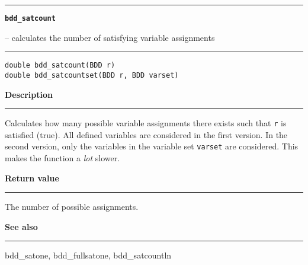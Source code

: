 \vspace{8ex}
\begin{minipage}{\textwidth}

\noindent\begin{minipage}{\textwidth}
\rule{\textwidth}{0.5mm}
{\tt\bf bdd\_satcount }
\--- calculates the number of satisfying variable assignments  \hspace{\fill}
\\\rule[1.5ex]{\textwidth}{0.5mm}
\end{minipage}

\noindent\begin{verbatim}
double bdd_satcount(BDD r)
double bdd_satcountset(BDD r, BDD varset) 
\end{verbatim}

\vspace{\parsep}\noindent
{\bf Description}\\\rule[1.5ex]{\textwidth}{0.2mm}\vspace{-1.5ex}\setlength{\parindent}{1em}
Calculates how many possible variable assignments there exists
           such that {\tt r} is satisfied (true). All defined
	   variables are considered in the first version. In the
	   second version, only the variables in the variable
	   set {\tt varset} are considered. This makes the function a
	   {\em lot} slower. 

\setlength{\parindent}{0em}\vspace{\parsep}\vspace{\baselineskip}\noindent
{\bf Return value}\\\rule[1.5ex]{\textwidth}{0.2mm}\vspace{-1.5ex}
The number of possible assignments. 

\vspace{\parsep}\vspace{\baselineskip}\noindent
{\bf See also}\\\rule[1.5ex]{\textwidth}{0.2mm}\vspace{-1.5ex}
bdd\_satone, bdd\_fullsatone, bdd\_satcountln 
\end{minipage}
\vspace{8ex}
